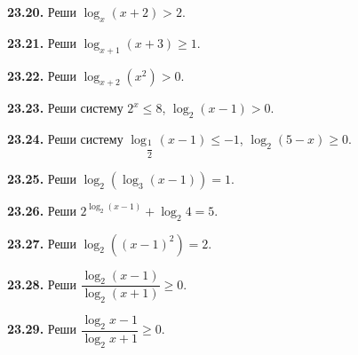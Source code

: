 \noindent\begin{minipage}[t]{\linewidth}\textbf{23.20.}\starmark{} Реши \(\log_x(x+2)>2\).\par\end{minipage}\par
\noindent\begin{minipage}[t]{\linewidth}\textbf{23.21.}\starmark{} Реши \(\log_{x+1}(x+3)\geq1\).\par\end{minipage}\par
\noindent\begin{minipage}[t]{\linewidth}\textbf{23.22.}\starmark{} Реши \(\log_{x+2}(x^2)>0\).\par\end{minipage}\par
\noindent\begin{minipage}[t]{\linewidth}\textbf{23.23.} Реши систему \(2^x\leq8\), \(\log_2(x-1)>0\).\par\end{minipage}\par
\noindent\begin{minipage}[t]{\linewidth}\textbf{23.24.} Реши систему \(\log_{\dfrac12}(x-1)\leq-1\), \(\log_2(5-x)\geq0\).\par\end{minipage}\par
\noindent\begin{minipage}[t]{\linewidth}\textbf{23.25.}\starmark{} Реши \(\log_2(\log_3(x-1))=1\).\par\end{minipage}\par
\noindent\begin{minipage}[t]{\linewidth}\textbf{23.26.} Реши \(2^{\log_2(x-1)}+\log_2 4=5\).\par\end{minipage}\par
\noindent\begin{minipage}[t]{\linewidth}\textbf{23.27.} Реши \(\log_2((x-1)^2)=2\).\par\end{minipage}\par
\noindent\begin{minipage}[t]{\linewidth}\textbf{23.28.}\starmark{} Реши \(\dfrac{\log_2(x-1)}{\log_2(x+1)}\geq0\).\par\end{minipage}\par
\noindent\begin{minipage}[t]{\linewidth}\textbf{23.29.}\starmark{} Реши \(\dfrac{\log_2x-1}{\log_2x+1}\geq0\).\par\end{minipage}\par

